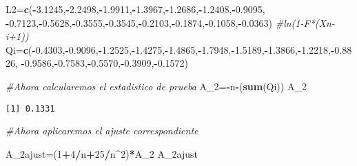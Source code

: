 \documentclass[a4paper,oneside,openany]{book}
\newenvironment{Shaded}{\begin{snugshade}}{\end{snugshade}}
\newcommand{\KeywordTok}[1]{\textcolor[rgb]{0.13,0.29,0.53}{\textbf{#1}}}
\newcommand{\DecValTok}[1]{\textcolor[rgb]{0.00,0.00,0.81}{#1}}
\newcommand{\FloatTok}[1]{\textcolor[rgb]{0.00,0.00,0.81}{#1}}
\newcommand{\CommentTok}[1]{\textcolor[rgb]{0.56,0.35,0.01}{\textit{#1}}}
\newcommand{\OperatorTok}[1]{\textcolor[rgb]{0.81,0.36,0.00}{\textbf{#1}}}
\newcommand{\NormalTok}[1]{#1}
\begin{document}
\begin{Shaded}
\begin{Highlighting}[]
\NormalTok{L2=}\KeywordTok{c}\NormalTok{(}\OperatorTok{-}\FloatTok{3.1245}\NormalTok{,}\OperatorTok{-}\FloatTok{2.2498}\NormalTok{,}\OperatorTok{-}\FloatTok{1.9911}\NormalTok{,}\OperatorTok{-}\FloatTok{1.3967}\NormalTok{,}\OperatorTok{-}\FloatTok{1.2686}\NormalTok{,}\OperatorTok{-}\FloatTok{1.2408}\NormalTok{,}\OperatorTok{-}\FloatTok{0.9095}\NormalTok{,}
\OperatorTok{-}\FloatTok{0.7123}\NormalTok{,}\OperatorTok{-}\FloatTok{0.5628}\NormalTok{,}\OperatorTok{-}\FloatTok{0.3555}\NormalTok{,}\OperatorTok{-}\FloatTok{0.3545}\NormalTok{,}\OperatorTok{-}\FloatTok{0.2103}\NormalTok{,}\OperatorTok{-}\FloatTok{0.1874}\NormalTok{,}\OperatorTok{-}\FloatTok{0.1058}\NormalTok{,}\OperatorTok{-}\FloatTok{0.0363}\NormalTok{)  }\CommentTok{#ln(1-F*(Xn-i+1))}
\NormalTok{Qi=}\KeywordTok{c}\NormalTok{(}\OperatorTok{-}\FloatTok{0.4303}\NormalTok{,}\OperatorTok{-}\FloatTok{0.9096}\NormalTok{,}\OperatorTok{-}\FloatTok{1.2525}\NormalTok{,}\OperatorTok{-}\FloatTok{1.4275}\NormalTok{,}\OperatorTok{-}\FloatTok{1.4865}\NormalTok{,}\OperatorTok{-}\FloatTok{1.7948}\NormalTok{,}\OperatorTok{-}\FloatTok{1.5189}\NormalTok{,}\OperatorTok{-}\FloatTok{1.3866}\NormalTok{,}\OperatorTok{-}\FloatTok{1.2218}\NormalTok{,}\OperatorTok{-}\FloatTok{0.8826}\NormalTok{,}
\OperatorTok{-}\FloatTok{0.9586}\NormalTok{,}\OperatorTok{-}\FloatTok{0.7583}\NormalTok{,}\OperatorTok{-}\FloatTok{0.5570}\NormalTok{,}\OperatorTok{-}\FloatTok{0.3909}\NormalTok{,}\OperatorTok{-}\FloatTok{0.1572}\NormalTok{)}

\CommentTok{#Ahora calcularemos el estadistico de prueba}
\NormalTok{A_}\DecValTok{2}\NormalTok{=}\OperatorTok{-}\NormalTok{n}\OperatorTok{-}\NormalTok{(}\KeywordTok{sum}\NormalTok{(Qi))}
\NormalTok{A_}\DecValTok{2}
\end{Highlighting}
\end{Shaded}

\begin{verbatim}
[1] 0.1331
\end{verbatim}

\begin{Shaded}
\begin{Highlighting}[]
\CommentTok{#Ahora aplicaremos el ajuste correspondiente}

\NormalTok{A_2ajust=(}\DecValTok{1}\OperatorTok{+}\DecValTok{4}\OperatorTok{/}\NormalTok{n}\OperatorTok{+}\DecValTok{25}\OperatorTok{/}\NormalTok{n}\OperatorTok{^}\DecValTok{2}\NormalTok{)}\OperatorTok{*}\NormalTok{A_}\DecValTok{2}
\NormalTok{A_2ajust}
\end{Highlighting}
\end{Shaded}
\end{document}
